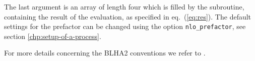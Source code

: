 The last argument is an array of length four which is filled by the subroutine, 
containing the result of the evaluation, as specified in eq.~(\ref{eq:res}).
The default settings for the prefactor can be changed using the option {\tt nlo\_prefactor}, 
see section \ref{chp:setup-of-a-process}.

For more details concerning the BLHA2 conventions we refer to \cite{Alioli:2013nda}.

